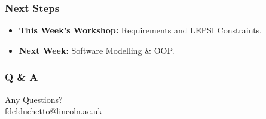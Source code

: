\documentclass[xcolor=table]{beamer}
\begin{document}
\begin{frame}
    \frametitle{Next Steps}
    \begin{itemize}
        \item \textbf{This Week's Workshop:} Requirements and LEPSI Constraints.
        \item \textbf{Next Week:} Software Modelling \& OOP.
    \end{itemize}
\end{frame}

\begin{frame}
    \frametitle{Q \& A}
    \begin{center}
        \Huge Any Questions?\\\vspace{0.5cm} 
        \normalsize fdelduchetto@lincoln.ac.uk
    \end{center}
\end{frame}
\end{document}
